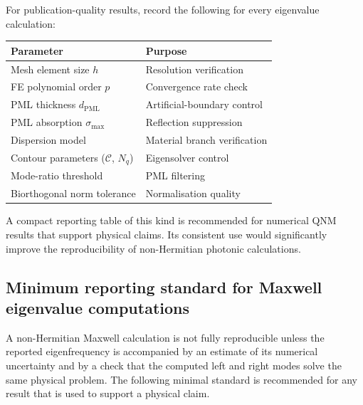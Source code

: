 For publication-quality results, record the following for every
eigenvalue calculation:
\begin{center}
\begin{tabular}{ll}
 \hline
 \textbf{Parameter} & \textbf{Purpose} \\
 \hline
 Mesh element size $h$ & Resolution verification \\
 FE polynomial order $p$ & Convergence rate check \\
 PML thickness $d_{\mathrm{PML}}$ & Artificial-boundary control \\
 PML absorption $\sigma_{\max}$ & Reflection suppression \\
 Dispersion model & Material branch verification \\
 Contour parameters ($\mathcal{C}$, $N_q$) & Eigensolver control \\
 Mode-ratio threshold & PML filtering \\
 Biorthogonal norm tolerance & Normalisation quality \\
 \hline
\end{tabular}
\end{center}
A compact reporting table of this kind is recommended for numerical QNM
results that support physical claims. Its consistent use would
significantly improve the reproducibility of non-Hermitian photonic
calculations.



\subsection{Minimum reporting standard for Maxwell eigenvalue computations}
\label{ssec:min-reporting-standard}

A non-Hermitian Maxwell calculation is not fully reproducible unless the
reported eigenfrequency is accompanied by an estimate of its numerical
uncertainty and by a check that the computed left and right modes solve
the same physical problem.  The following minimal standard is recommended
for any result that is used to support a physical claim.

